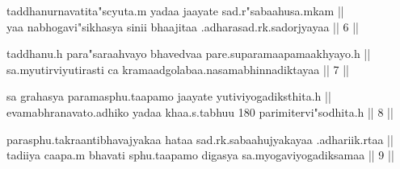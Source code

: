{taddhanurnavatita"scyuta.m yadaa jaayate sad.r"sabaahusa.m{}kam ||\\
yaa nabhogavi"sikhasya si{}nii bhaajitaa .adharasad.rk.sadorjyayaa || 6 ||

taddhanu.h para"saraahvayo bhavedvaa pare.suparamaapamaakhyayo.h ||\\
sa.myutirviyutirasti ca kramaadgolabaa.nasamabhinnadiktayaa || 7 ||

sa grahasya paramasphu.taapamo jaayate yutiviyogadiksthita.h ||\\
evamabhranavato.adhiko yadaa khaa.s.tabhuu 180 parimitervi"sodhita.h || 8 || 

parasphu.takraantibhavajyakaa hataa  sad.rk.sabaahujyakayaa .adhariik.rtaa ||  \\
tadiiya caapa.m bhavati sphu.taapamo digasya sa.myogaviyogadiksamaa || 9 || %
}
